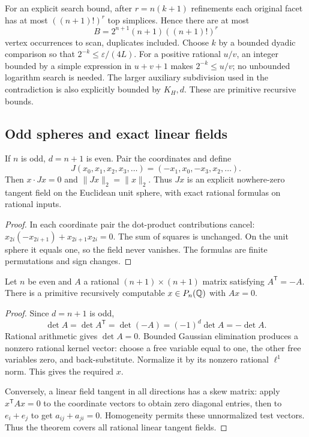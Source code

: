 For an explicit search bound, after $r=n(k+1)$ refinements each original facet has at most $((n+1)!)^r$ top simplices. Hence there are at most
\[
 B=2^{n+1}(n+1)((n+1)!)^r
\]
vertex occurrences to scan, duplicates included. Choose $k$ by a bounded dyadic comparison so that $2^{-k}\leq\varepsilon/(4L)$. For a positive rational $u/v$, an integer bounded by a simple expression in $u+v+1$ makes $2^{-k}\leq u/v$; no unbounded logarithm search is needed. The larger auxiliary subdivision used in the contradiction is also explicitly bounded by $K_H,d$. These are primitive recursive bounds.

\subsection{Odd spheres and exact linear fields}

\begin{theorem}\label{thm:odd-field}
If $n$ is odd, $d=n+1$ is even. Pair the coordinates and define
\[
 J(x_0,x_1,x_2,x_3,\ldots)
   =(-x_1,x_0,-x_3,x_2,\ldots).
\]
Then $x\cdot Jx=0$ and $\|Jx\|_2=\|x\|_2$. Thus $Jx$ is an explicit nowhere-zero tangent field on the Euclidean unit sphere, with exact rational formulas on rational inputs.
\end{theorem}
\begin{proof}
In each coordinate pair the dot-product contributions cancel:
$x_{2i}(-x_{2i+1})+x_{2i+1}x_{2i}=0$.
The sum of squares is unchanged. On the unit sphere it equals one, so the field never vanishes. The formulas are finite permutations and sign changes.
\end{proof}

\begin{theorem}\label{thm:linear-hairy}
Let $n$ be even and $A$ a rational $(n+1)\times(n+1)$ matrix satisfying $A^{\mathsf T}=-A$. There is a primitive recursively computable $x\in P_n(\mathbb Q)$ with $Ax=0$.
\end{theorem}
\begin{proof}
Since $d=n+1$ is odd,
\[
 \det A=\det A^{\mathsf T}=\det(-A)=(-1)^d\det A=-\det A.
\]
Rational arithmetic gives $\det A=0$. Bounded Gaussian elimination produces a nonzero rational kernel vector: choose a free variable equal to one, the other free variables zero, and back-substitute. Normalize it by its nonzero rational $\ell^1$ norm. This gives the required $x$.

Conversely, a linear field tangent in all directions has a skew matrix: apply $x^{\mathsf T}Ax=0$ to the coordinate vectors to obtain zero diagonal entries, then to $e_i+e_j$ to get $a_{ij}+a_{ji}=0$. Homogeneity permits these unnormalized test vectors. Thus the theorem covers all rational linear tangent fields.
\end{proof}

